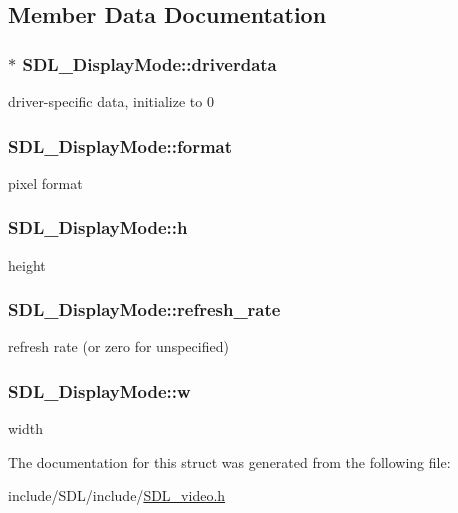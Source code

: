 \subsection{Member Data Documentation}
\hypertarget{struct_s_d_l___display_mode_a411f93025411da873f37a384ae62bbcf}{
\subsubsection[{driverdata}]{$\ast$ S\-D\-L\-\_\-\-Display\-Mode\-::driverdata}}\label{struct_s_d_l___display_mode_a411f93025411da873f37a384ae62bbcf}
driver-\/specific data, initialize to 0 \hypertarget{struct_s_d_l___display_mode_ae8120e0a18a99992f039756e1b503680}{
\subsubsection[{format}]{ S\-D\-L\-\_\-\-Display\-Mode\-::format}}\label{struct_s_d_l___display_mode_ae8120e0a18a99992f039756e1b503680}
pixel format \hypertarget{struct_s_d_l___display_mode_a0d9eabed50a560ed553af772c26632d7}{
\subsubsection[{h}]{ S\-D\-L\-\_\-\-Display\-Mode\-::h}}\label{struct_s_d_l___display_mode_a0d9eabed50a560ed553af772c26632d7}
height \hypertarget{struct_s_d_l___display_mode_ad1b5783c9b292ebf24ad4e0e7a98e540}{
\subsubsection[{refresh\-\_\-rate}]{ S\-D\-L\-\_\-\-Display\-Mode\-::refresh\-\_\-rate}}\label{struct_s_d_l___display_mode_ad1b5783c9b292ebf24ad4e0e7a98e540}
refresh rate (or zero for unspecified) \hypertarget{struct_s_d_l___display_mode_a504bb5e21950b719a0df43be51199046}{
\subsubsection[{w}]{ S\-D\-L\-\_\-\-Display\-Mode\-::w}}\label{struct_s_d_l___display_mode_a504bb5e21950b719a0df43be51199046}
width 

The documentation for this struct was generated from the following file\-:\begin{DoxyCompactItemize}
\item 
include/\-S\-D\-L/include/\hyperlink{_s_d_l__video_8h}{S\-D\-L\-\_\-video.\-h}\end{DoxyCompactItemize}
